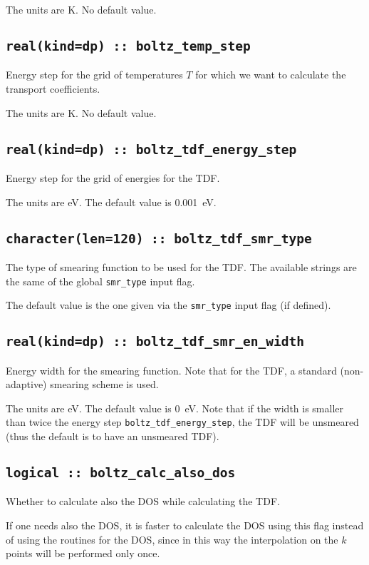 The units are K.
No default value.

\subsection[boltz\_temp\_step]{\tt real(kind=dp) :: boltz\_temp\_step}
Energy step for the grid of temperatures $T$ for which we want to calculate the transport coefficients.

The units are K.
No default value.

\subsection[boltz\_tdf\_energy\_step]{\tt real(kind=dp) :: boltz\_tdf\_energy\_step}
Energy step for the grid of energies for the TDF.

The units are eV.
The default value is 0.001~eV.

\subsection[boltz\_tdf\_smr\_type]{\tt character(len=120) :: boltz\_tdf\_smr\_type}
The type of smearing function to be used for the TDF. The available strings are the same of the global {\tt smr\_type} input flag. 

The default value is the one given via the {\tt smr\_type} input flag (if defined).

\subsection[boltz\_tdf\_smr\_en\_width]{\tt real(kind=dp) :: boltz\_tdf\_smr\_en\_width}
Energy width for the smearing function. Note that for the TDF, a standard (non-adaptive) smearing scheme is used.

The units are eV.
The default value is 0~eV. Note that if the width is smaller than twice the energy step {\tt boltz\_tdf\_energy\_step}, the TDF will be unsmeared (thus the default is to have an unsmeared TDF).

\subsection[boltz\_calc\_also\_dos]{\tt logical :: boltz\_calc\_also\_dos}
Whether to calculate also the DOS while calculating the TDF.

If one needs also the DOS, it is faster to calculate the DOS using this flag instead of using the routines for the DOS, since in this way the interpolation on the $k$ points will be performed only once.

